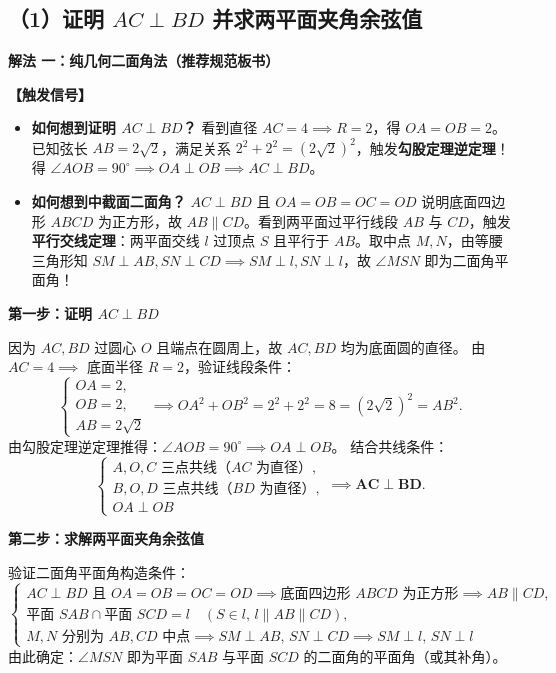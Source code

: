 \documentclass[11pt,a4paper,fontset=fandol]{ctexart}
\newcommand{\method}[1]{\par\medskip\noindent\textbf{解法 #1}\par}
\begin{document}
\subsection*{（1）证明 $AC \perp BD$ 并求两平面夹角余弦值}

\method{一：纯几何二面角法（推荐规范板书）}

\noindent\textbf{【触发信号】}
\begin{itemize}[leftmargin=1.5em]
  \item \textbf{如何想到证明 $AC \perp BD$？} 看到直径 \(AC=4 \implies R=2\)，得 \(OA=OB=2\)。已知弦长 \(AB=2\sqrt{2}\)，满足关系 \(2^2 + 2^2 = (2\sqrt{2})^2\)，触发\textbf{勾股定理逆定理}！得 \(\angle AOB = 90^\circ \implies OA \perp OB \implies AC \perp BD\)。
  \item \textbf{如何想到中截面二面角？} \(AC \perp BD\) 且 $OA=OB=OC=OD$ 说明底面四边形 $ABCD$ 为正方形，故 \(AB \parallel CD\)。看到两平面过平行线段 $AB$ 与 $CD$，触发\textbf{平行交线定理}：两平面交线 $l$ 过顶点 $S$ 且平行于 $AB$。取中点 $M, N$，由等腰三角形知 $SM \perp AB, SN \perp CD \implies SM \perp l, SN \perp l$，故 $\angle MSN$ 即为二面角平面角！
\end{itemize}

\textbf{第一步：证明 $AC \perp BD$}

因为 $AC, BD$ 过圆心 $O$ 且端点在圆周上，故 $AC, BD$ 均为底面圆的直径。
由 $AC = 4 \implies$ 底面半径 $R = 2$，验证线段条件：
\[
\begin{cases}
OA = 2,\\[0.3em]
OB = 2,\\[0.3em]
AB = 2\sqrt{2}
\end{cases}
\implies OA^2 + OB^2 = 2^2 + 2^2 = 8 = (2\sqrt{2})^2 = AB^2.
\]
由勾股定理逆定理推得：$\angle AOB = 90^\circ \implies OA \perp OB$。
结合共线条件：
\[
\begin{cases}
A, O, C \text{ 三点共线（} AC \text{ 为直径）},\\[0.3em]
B, O, D \text{ 三点共线（} BD \text{ 为直径）},\\[0.3em]
OA \perp OB
\end{cases}
\implies \mathbf{AC \perp BD}.
\]

\textbf{第二步：求解两平面夹角余弦值}

验证二面角平面角构造条件：
\[
\begin{cases}
AC \perp BD \text{ 且 } OA=OB=OC=OD \implies \text{底面四边形 } ABCD \text{ 为正方形} \implies AB \parallel CD,\\[0.4em]
\text{平面 } SAB \cap \text{平面 } SCD = l \quad (S \in l, \, l \parallel AB \parallel CD),\\[0.4em]
M, N \text{ 分别为 } AB, CD \text{ 中点} \implies SM \perp AB, \, SN \perp CD \implies SM \perp l, \, SN \perp l
\end{cases}
\]
由此确定：$\angle MSN$ 即为平面 $SAB$ 与平面 $SCD$ 的二面角的平面角（或其补角）。
\end{document}
